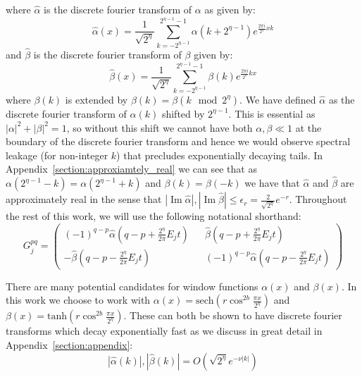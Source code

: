 \documentclass[aps,floatfix,10pt,amssymb,amsfont,amsmath,superscriptaddress,float,nofootinbib,longbibliography,nobalancelastpage,twocolumn]{revtex4-2}
\begin{document}
\begin{widetext}
where $\hat \alpha$ is the discrete fourier transform of $\alpha$ as given by:
\begin{equation}
   \hat\alpha(x) =\frac{1}{\sqrt{2^{\eta}}}\sum_{k=-2^{\eta-1}}^{2^{\eta-1}-1} \alpha(k+2^{\eta-1})e^{\frac{2\pi i}{2^{\eta}}xk}
\end{equation}
and $\hat \beta$ is the discrete fourier transform of $\beta$ given by:
\begin{equation}
    \hat\beta(x) =\frac{1}{\sqrt{2^{\eta}}}\sum_{k=-2^{\eta-1}}^{2^{\eta-1}-1} \beta(k)e^{\frac{2\pi i}{2^{\eta}}kx}
\end{equation}
 where $\beta(k)$ is extended by $\beta(k) = \beta(k \mod 2^{\eta})$. We have defined $\hat \alpha$ as the discrete fourier transform of $\alpha(k)$ shifted by $2^{\eta-1}$. This is essential as $|\alpha|^2+|\beta|^2=1$, so without this shift we cannot have both $\alpha, \beta \ll1$ at the boundary of the discrete fourier transform and hence we would observe spectral leakage (for non-integer $k$) that precludes exponentially decaying tails. In Appendix~\ref{section:approxiamtely_real} we can see that as $\alpha(2^{\eta-1} - k) = \alpha(2^{\eta-1}+k)$ and $\beta(k) = \beta(-k)$ we have that $\hat \alpha$ and $\hat \beta$ are approximately real in the sense that $|\operatorname{Im}\hat \alpha|,|\operatorname{Im}\hat \beta| \leq \epsilon_r = \frac{2}{\sqrt{2^{\eta}}}e^{-r}$. Throughout the rest of this work, we will use the following notational shorthand: 
\begin{equation}
    G_j^{pq} = \begin{pmatrix}
        (-1)^{q-p}\hat\alpha(q-p+\frac{2^{\eta}}{2\pi}E_jt) && \hat\beta(q-p+\frac{2^{\eta}}{2\pi}E_jt)\\
        -\hat\beta (q-p-\frac{2^{\eta}}{2\pi}E_jt) && (-1)^{q-p}\hat\alpha(q-p-\frac{2^{\eta}}{2\pi}E_jt)
    \end{pmatrix}
\end{equation}
\end{widetext}
There are many potential candidates for window functions $\alpha(x)$ and $\beta(x)$. In this work we choose to work with $\alpha(x) = \text{sech}( r\cos^{2b} \frac{\pi x}{2^{\eta}})$ and $\beta(x) = \text{tanh}(r \cos^{2b} \frac{\pi x}{2^{\eta}})$. These can both be shown to have discrete fourier transforms which decay exponentially fast as we discuss in great detail in Appendix~\ref{section:appendix}:
\begin{equation}
    |\hat \alpha(k)|,|\hat \beta(k)| = O\left( \sqrt{2^{\eta}}e^{-\nu |k|}\right)
    \label{eq:scaling}
\end{equation}
\end{document}
